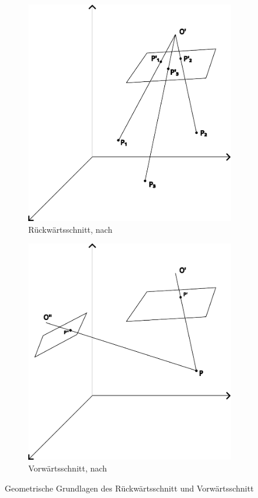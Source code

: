\documentclass[./00PhotoBox.tex]{subfiles}
\begin{document}
\begin{figure}
    \centering
    \begin{subfigure}{0.45\textwidth}
        \includegraphics[width=0.9\linewidth]{img/2_grundlagen/rueckwaertsschnitt.pdf}
        \centering
        \caption{Rückwärtsschnitt, nach \\ \citealt[S. 284]{luhmann}}
        \label{img:rueckwaertsschnitt}
    \end{subfigure}
    \begin{subfigure}{0.45\textwidth}
        \includegraphics[width=0.9\linewidth]{img/2_grundlagen/vorwaertsschnitt.pdf}
        \centering
        \caption{Vorwärtsschnitt, nach \\ \citealt[S. 339]{luhmann}}
        \label{img:vorwaertsschnitt}
    \end{subfigure}
    \caption{Geometrische Grundlagen des Rückwärtsschnitt und Vorwärtsschnitt}
\end{figure}
\end{document}
